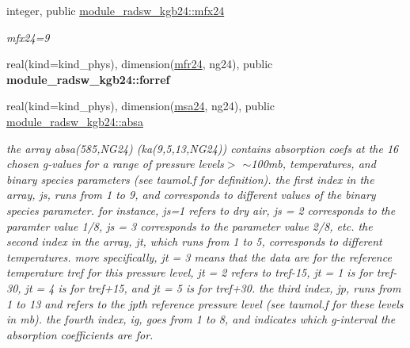 \begin{DoxyCompactItemize}
\mbox{\label{group__module__radsw__kgbnn_ga6fcafb0e1605ad49a252ed1e22b00a5b}} 
integer, public \hyperlink{group__module__radsw__kgbnn_ga6fcafb0e1605ad49a252ed1e22b00a5b}{module\+\_\+radsw\+\_\+kgb24\+::mfx24}
\begin{DoxyCompactList}\small\item\em mfx24=9 \end{DoxyCompactList}\item 
\mbox{\label{group__module__radsw__kgbnn_gac57357ab300edcbad8f7b3801b796af3}} 
real(kind=kind\+\_\+phys), dimension(\hyperlink{group__module__radsw__kgbnn_ga3a1c3808493ce89f2218116a02350e51}{mfr24}, ng24), public {\bfseries module\+\_\+radsw\+\_\+kgb24\+::forref}
\item 
\mbox{\label{group__module__radsw__kgbnn_ga06965ec156c4e1d18d50a70ba43bd8e1}} 
real(kind=kind\+\_\+phys), dimension(\hyperlink{namespacemodule__radsw__kgb24_ad416df05aed8a6ae1ecd57d5c90c223c}{msa24}, ng24), public \hyperlink{group__module__radsw__kgbnn_ga06965ec156c4e1d18d50a70ba43bd8e1}{module\+\_\+radsw\+\_\+kgb24\+::absa}
\begin{DoxyCompactList}\small\item\em the array absa(585,\+N\+G24) (ka(9,5,13,\+N\+G24)) contains absorption coefs at the 16 chosen g-\/values for a range of pressure levels$>$ $\sim$100mb, temperatures, and binary species parameters (see taumol.\+f for definition). the first index in the array, js, runs from 1 to 9, and corresponds to different values of the binary species parameter. for instance, js=1 refers to dry air, js = 2 corresponds to the paramter value 1/8, js = 3 corresponds to the parameter value 2/8, etc. the second index in the array, jt, which runs from 1 to 5, corresponds to different temperatures. more specifically, jt = 3 means that the data are for the reference temperature tref for this pressure level, jt = 2 refers to tref-\/15, jt = 1 is for tref-\/30, jt = 4 is for tref+15, and jt = 5 is for tref+30. the third index, jp, runs from 1 to 13 and refers to the jpth reference pressure level (see taumol.\+f for these levels in mb). the fourth index, ig, goes from 1 to 8, and indicates which g-\/interval the absorption coefficients are for. \end{DoxyCompactList}\item 
\mbox{\label{group__module__radsw__kgbnn_gabd4db3c9678fee17f2cfd4a3e290619a}} 

\end{DoxyCompactItemize}
